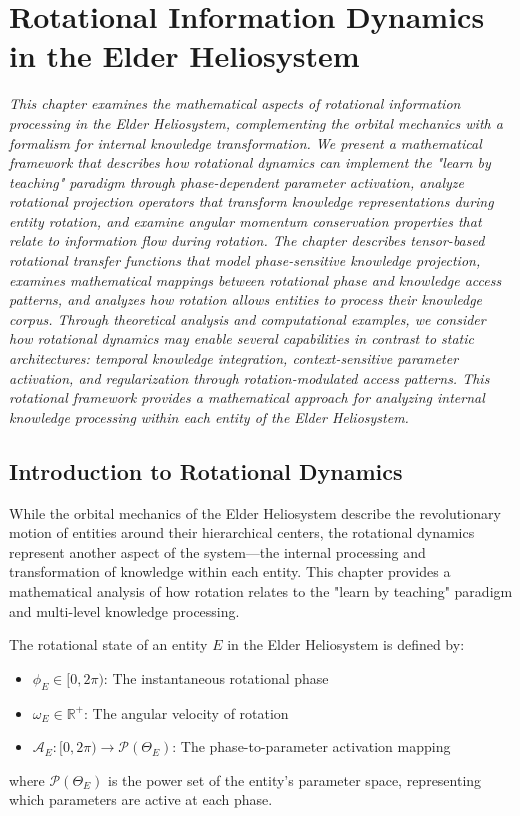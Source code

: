 \chapter{Rotational Information Dynamics in the Elder Heliosystem}

\textit{This chapter examines the mathematical aspects of rotational information processing in the Elder Heliosystem, complementing the orbital mechanics with a formalism for internal knowledge transformation. We present a mathematical framework that describes how rotational dynamics can implement the "learn by teaching" paradigm through phase-dependent parameter activation, analyze rotational projection operators that transform knowledge representations during entity rotation, and examine angular momentum conservation properties that relate to information flow during rotation. The chapter describes tensor-based rotational transfer functions that model phase-sensitive knowledge projection, examines mathematical mappings between rotational phase and knowledge access patterns, and analyzes how rotation allows entities to process their knowledge corpus. Through theoretical analysis and computational examples, we consider how rotational dynamics may enable several capabilities in contrast to static architectures: temporal knowledge integration, context-sensitive parameter activation, and regularization through rotation-modulated access patterns. This rotational framework provides a mathematical approach for analyzing internal knowledge processing within each entity of the Elder Heliosystem.}

\section{Introduction to Rotational Dynamics}

While the orbital mechanics of the Elder Heliosystem describe the revolutionary motion of entities around their hierarchical centers, the rotational dynamics represent another aspect of the system—the internal processing and transformation of knowledge within each entity. This chapter provides a mathematical analysis of how rotation relates to the "learn by teaching" paradigm and multi-level knowledge processing.

\begin{definition}
The rotational state of an entity $E$ in the Elder Heliosystem is defined by:
\begin{itemize}
    \item $\phi_E \in [0, 2\pi)$: The instantaneous rotational phase
    \item $\omega_E \in \mathbb{R}^+$: The angular velocity of rotation
    \item $\mathcal{A}_E: [0, 2\pi) \rightarrow \mathcal{P}(\Theta_E)$: The phase-to-parameter activation mapping
\end{itemize}
where $\mathcal{P}(\Theta_E)$ is the power set of the entity's parameter space, representing which parameters are active at each phase.
\end{definition}

